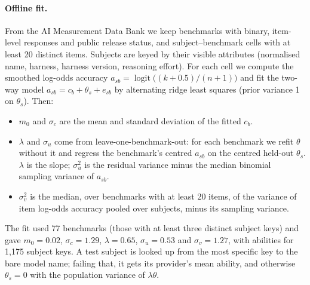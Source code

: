 \documentclass{article}
\begin{document}
\paragraph{Offline fit.} From the AI Measurement Data Bank \citep{measurementdb2026} we keep benchmarks with binary, item-level responses and public release status, and subject--benchmark cells with at least 20 distinct items. Subjects are keyed by their visible attributes (normalised name, harness, harness version, reasoning effort). For each cell we compute the smoothed log-odds accuracy $a_{sb} = \operatorname{logit}\big((k+0.5)/(n+1)\big)$ and fit the two-way model $a_{sb} = c_b + \theta_s + e_{sb}$ by alternating ridge least squares (prior variance 1 on $\theta_s$). Then:
\begin{itemize}
  \item $m_0$ and $\sigma_c$ are the mean and standard deviation of the fitted $c_b$.
  \item $\lambda$ and $\sigma_u$ come from leave-one-benchmark-out: for each benchmark we refit $\theta$ without it and regress the benchmark's centred $a_{sb}$ on the centred held-out $\theta_s$. $\lambda$ is the slope; $\sigma_u^2$ is the residual variance minus the median binomial sampling variance of $a_{sb}$.
  \item $\sigma_v^2$ is the median, over benchmarks with at least 20 items, of the variance of item log-odds accuracy pooled over subjects, minus its sampling variance.
\end{itemize}
The fit used 77 benchmarks (those with at least three distinct subject keys) and gave $m_0 = 0.02$, $\sigma_c = 1.29$, $\lambda = 0.65$, $\sigma_u = 0.53$ and $\sigma_v = 1.27$, with abilities for 1{,}175 subject keys. A test subject is looked up from the most specific key to the bare model name; failing that, it gets its provider's mean ability, and otherwise $\theta_s = 0$ with the population variance of $\lambda\theta$.
\end{document}
